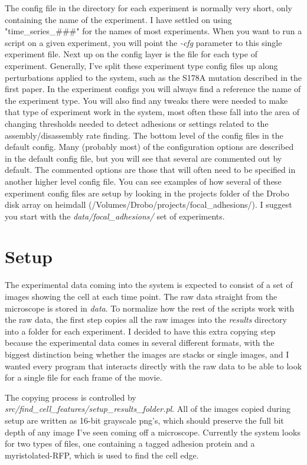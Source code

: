 \documentclass[letterpaper]{article}
\begin{document}
	The config file in the directory for each experiment is normally very short,
	only containing the name of the experiment. I have settled on using
	"time\_series\_\#\#\#" for the names of most experiments. When you want to
	run a script on a given experiment, you will point the \emph{-cfg} parameter
	to this single experiment file. Next up on the config layer is the file for
	each type of experiment. Generally, I've split these experiment type config
	files up along perturbations applied to the system, such as the S178A
	mutation described in the first paper. In the experiment configs you will
	always find a reference the name of the experiment type. You will also find
	any tweaks there were needed to make that type of experiment work in the
	system, most often these fall into the area of changing thresholds needed to
	detect adhesions or settings related to the assembly/disassembly rate
	finding. The bottom level of the config files in the default config. Many
	(probably most) of the configuration options are described in the default
	config file, but you will see that several are commented out by default. The
	commented options are those that will often need to be specified in another
	higher level config file.  You can see examples of how several of these
	experiment config files are setup by looking in the projects folder of the
	Drobo disk array on heimdall (/Volumes/Drobo/projects/focal\_adhesions/). I
	suggest you start with the \emph{data/focal\_adhesions/} set of experiments.

\section{Setup}
	The experimental data coming into the system is expected to consist of a set
	of images showing the cell at each time point. The raw data straight from
	the microscope is stored in \emph{data}. To normalize how the rest of the
	scripts work with the raw data, the first step copies all the raw images
	into the \emph{results} directory into a folder for each experiment. I
	decided to have this extra copying step because the experimental data comes
	in several different formats, with the biggest distinction being
	whether the images are stacks or single images, and I wanted every program
	that interacts directly with the raw data to be able to look for a single
	file for each frame of the movie.

	The copying process is controlled by
	\emph{src/find\_cell\_features/setup\_results\_folder.pl}. All of the images
	copied during setup are written as 16-bit grayscale png's, which should
	preserve the full bit depth of any image I've seen coming off a microscope.
	Currently the system looks for two types of files, one containing a tagged
	adhesion protein and a myristolated-RFP, which is used to find the cell
	edge.
\end{document}
